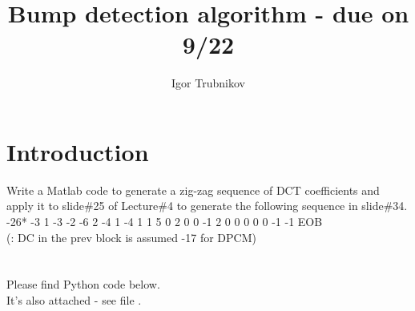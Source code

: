 \documentclass[14pt, letterpaper]{article}
\title{Bump detection algorithm - due on 9/22}
\author{Igor Trubnikov}
\begin{document}
\maketitle
\tableofcontents
\newpage

\section{Introduction}
Write a Matlab code to generate a zig-zag sequence of DCT coefficients and apply it to slide\#25
of Lecture\#4 to generate the following sequence in slide\#34.\\
-26* -3 1 -3 -2 -6 2 -4 1 -4 1 1 5 0 2 0 0 -1 2 0 0 0 0 0 -1 -1 EOB\\
(: DC in the prev block is assumed -17 for DPCM)\\\\
\\Please find Python code below.\\
It's also attached - see file .
%

\newpage
\end{document}
